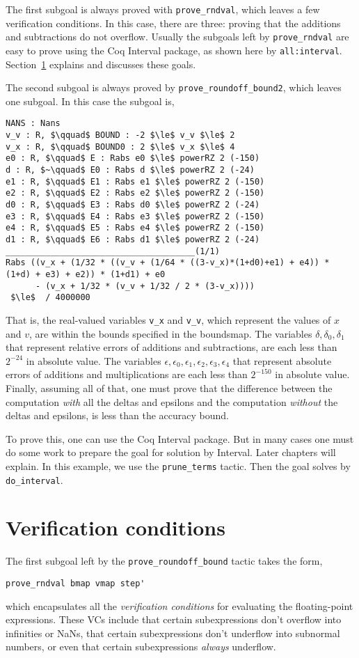 \documentclass[article]{memoir}
\begin{document}
The first subgoal is always proved with \lstinline{prove_rndval},
which leaves a few verification conditions.
In this case, there are three: proving that the additions
and subtractions do not overflow.  Usually the subgoals
left by \lstinline{prove_rndval} are easy to prove using the Coq
Interval package, as shown here by \lstinline{all:interval}.
Section~\ref{goal1} explains and discusses these goals.

The second subgoal
is always proved by
\lstinline{prove_roundoff_bound2}, which leaves
one subgoal.  In this case the subgoal is,

\begin{lstlisting}
NANS : Nans
v_v : R, $\qquad$ BOUND : -2 $\le$ v_v $\le$ 2
v_x : R, $\qquad$ BOUND0 : 2 $\le$ v_x $\le$ 4
e0 : R, $\qquad$ E : Rabs e0 $\le$ powerRZ 2 (-150)
d : R, $~\qquad$ E0 : Rabs d $\le$ powerRZ 2 (-24)
e1 : R, $\qquad$ E1 : Rabs e1 $\le$ powerRZ 2 (-150)
e2 : R, $\qquad$ E2 : Rabs e2 $\le$ powerRZ 2 (-150)
d0 : R, $\qquad$ E3 : Rabs d0 $\le$ powerRZ 2 (-24)
e3 : R, $\qquad$ E4 : Rabs e3 $\le$ powerRZ 2 (-150)
e4 : R, $\qquad$ E5 : Rabs e4 $\le$ powerRZ 2 (-150)
d1 : R, $\qquad$ E6 : Rabs d1 $\le$ powerRZ 2 (-24)
______________________________________(1/1)
Rabs ((v_x + (1/32 * ((v_v + (1/64 * ((3-v_x)*(1+d0)+e1) + e4)) * (1+d) + e3) + e2)) * (1+d1) + e0
      - (v_x + 1/32 * (v_v + 1/32 / 2 * (3-v_x))))
 $\le$  / 4000000
\end{lstlisting}
\label{stage2proofgoal}
That is, the real-valued variables \lstinline{v_x} and \lstinline{v_v},
which represent the values of $x$ and $v$, are within the bounds
specified in the boundsmap.  The variables 
$\delta,\delta_0,\delta_1$ that represent
relative errors of additions and subtractions, are each less than
$2^{-24}$ in absolute value.  The variables 
$\epsilon,\epsilon_0,\epsilon_1,\epsilon_2,\epsilon_3,\epsilon_4$ that
represent absolute errors of additions and multiplications
are each less than $2^{-150}$ in absolute value.
Finally, assuming all of that, one must prove that the
difference between the computation \emph{with} all the
deltas and epsilons and the computation \emph{without}
the deltas and epsilons, is less than the accuracy bound.

To prove this, one can use the Coq Interval package.  But in many
cases one must do some work to prepare the goal for solution by
Interval.  Later chapters will explain.
In this example, we use the \lstinline{prune_terms} tactic.
Then the goal solves by \lstinline{do_interval}.

\chapter{Verification conditions}
\label{goal1}
The first subgoal left by the \lstinline{prove_roundoff_bound} tactic
takes the form,
\begin{lstlisting}
prove_rndval bmap vmap step'
\end{lstlisting}
which encapsulates all the \emph{verification conditions} for
evaluating the floating-point expressions.  These VCs include that
certain subexpressions don't overflow into infinities or NaNs,
that certain subexpressions don't underflow into subnormal numbers,
or even that certain subexpressions \emph{always} underflow.
\end{document}
